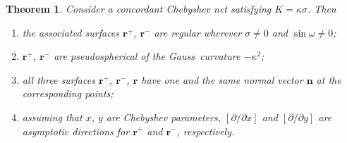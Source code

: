 \documentclass[pdftex]{sigma}
\let\ve\mathbf
\def\k{\kappa}
\newtheorem{Theorem}{Theorem}[section]
\numberwithin{equation}{section}
\begin{document}
\begin{Theorem}\label{thm:ccn->2ps}
Consider  a concordant Chebyshev net satisfying  $K = \k \sigma$.
Then
\begin{enumerate}\itemsep=0pt
\item[{\rm (i)}]  the associated surfaces  $\ve r^+$, $\ve r^-$ are regular
wherever $\sigma \ne 0$ and $\sin\omega \ne 0${\rm;}

\item[{\rm (ii)}]  $\ve r^+$, $\ve r^-$ are pseudospherical of the Gauss\ curvature $-\kappa^2${\rm;}

\item[{\rm (iii)}]  all three surfaces $\ve r^+$, $\ve r^-$, $\ve r$ have one and the same normal
vector $\ve n$ at the corresponding points\/{\rm;}

\item[{\rm (iv)}]  assuming that $x$, $y$ are Chebyshev parameters,
$[\partial/\partial x]$ and $[\partial/\partial y]$ are
asymptotic directions for $\ve r^+$ and $\ve r^-$, respectively.
\end{enumerate}
\end{Theorem}
\end{document}
